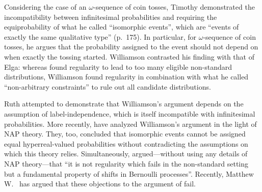 Considering the case of an $\omega$-sequence of coin tosses, Timothy \citet{Williamson:2007} demonstrated the incompatibility between infinitesimal probabilities and requiring the equiprobability of what he called ``isomorphic events'', which are ``events of exactly the same qualitative type'' (p.~175). In particular, for $\omega$-sequence of coin tosses, he argues that the probability assigned to the event should not depend on when exactly the tossing started.
Williamson contrasted his finding with that of Elga: whereas \citet{Elga:2004} found regularity to lead to too many eligible non-standard distributions, Williamson found regularity in combination with what he called ``non-arbitrary constraints'' to rule out all candidate distributions.

Ruth \citet{Weintraub:2008} attempted to demonstrate that Williamson's argument depends on the assumption of label-independence, which is itself incompatible with infinitesimal probabilities.
More recently, \citet{Benci_etal:2018} have analyzed Williamson's argument in the light of NAP theory. They, too, concluded that isomorphic events cannot be assigned equal hyper\-real-valued probabilities without contradicting the assumptions on which this theory relies.
Simultaneously, \citet{Howson:2017} argued---without using any details of NAP theory---that ``it is not regularity which fails in the non-standard setting but a fundamental property of shifts in Bernoulli processes''. Recently, Matthew W.~\citet{Parker:unpubl} has argued that these objections to the argument of \citet{Williamson:2007} fail.

